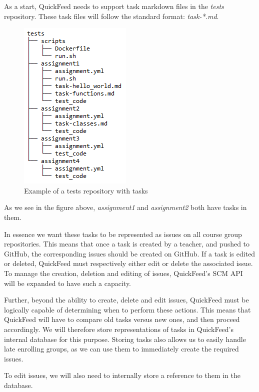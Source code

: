 As a start, QuickFeed needs to support task markdown files in the \textit{tests} repository.
These task files will follow the standard format: \textit{task-*.md}.

\begin{figure}[ht]
    \centering
    \includegraphics[scale=0.8]{photos/tests-repository-structure-tasks.PNG}
    \caption{Example of a tests repository with tasks}
    \label{fig:tests-repository-structure-tasks}
\end{figure}

As we see in the figure above, \textit{assignment1} and \textit{assignment2} both have tasks in them.

In essence we want these tasks to be represented as issues on all course group repositories.
This means that once a task is created by a teacher, and pushed to GitHub, the corresponding issues should be created on GitHub.
If a task is edited or deleted, QuickFeed must respectively either edit or delete the associated issue.
To manage the creation, deletion and editing of issues, QuickFeed's SCM API will be expanded to have such a capacity.

Further, beyond the ability to create, delete and edit issues, QuickFeed must be logically capable of determining when to perform these actions.
This means that QuickFeed will have to compare old tasks versus new ones, and then proceed accordingly.
We will therefore store representations of tasks in QuickFeed's internal database for this purpose.
Storing tasks also allows us to easily handle late enrolling groups, as we can use them to immediately create the required issues.

To edit issues, we will also need to internally store a reference to them in the database.

